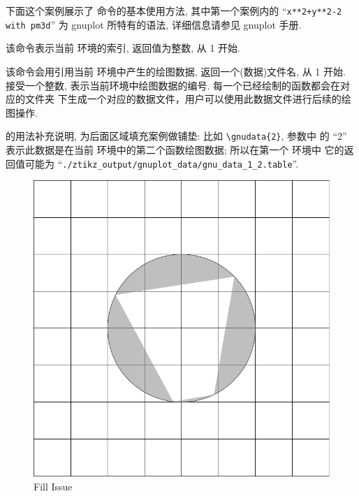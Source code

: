 \documentclass[
  hyper, lang=cn, 
  class=l3dox, 
]{../../zlatex/code/ztex}
\begin{document}
下面这个案例展示了  命令的基本使用方法, 其中第一个案例内的 ``\texttt{x**2+y**2-2 with pm3d}'' 
为 gnuplot 所特有的语法, 详细信息请参见 gnuplot 手册.



\begin{function}[added=2025-05-15]{\currentTikzIndex}
  该命令表示当前  环境的索引, 返回值为整数, 从 1 开始.
\end{function}


\begin{function}[added=2025-05-22, EXP]{\gnudata}
  \begin{syntax}
  \end{syntax}
  该命令会用引用当前  环境中产生的绘图数据, 返回一个(数据)文件名, 从 1 开始.
   接受一个整数, 表示当前环境中绘图数据的编号. 每一个已经绘制的函数都会在对应的文件夹
  下生成一个对应的数据文件，用户可以使用此数据文件进行后续的绘图操作.
\end{function}

\cmd{\gnudata} 的用法补充说明, 为后面区域填充案例做铺垫: 比如 \verb|\gnudata{2}|, 参数中
的 ``2'' 表示此数据是在当前  环境中的第二个函数绘图数据; 所以在第一个  环境中
它的返回值可能为 ``\texttt{./ztikz_output/gnuplot_data/gnu_data_1_2.table}''.

\begin{figure}[!htb]
  \centering
  \includegraphics[width=.5\linewidth]{./support//pics/contour_data_bug.pdf}
  \caption{ Fill Issue}
  \label{fig:contour-fill-bug}
\end{figure}
\end{document}
